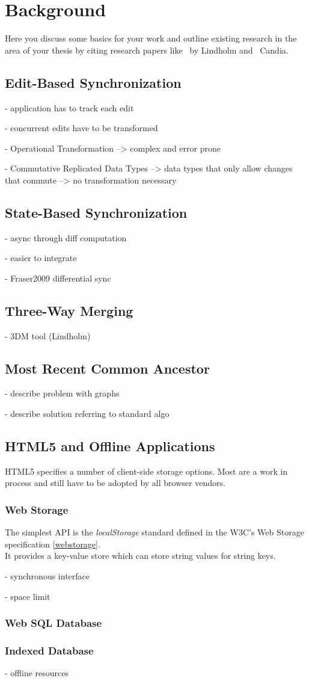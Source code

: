 
\chapter{Background}\label{background}

Here you discuss some basics for your work and outline existing research in the area of your thesis by citing research papers like~\cite{Lindholm:2009wo} by Lindholm and~\cite{DeCandia:2007ui,Ratner:2001wz} Candia.

\section{Edit-Based Synchronization}
- application has to track each edit

- concurrent edits have to be transformed

- Operational Transformation
  --> complex and error prone

- Commutative Replicated Data Types
  --> data types that only allow changes that commute
  --> no transformation necessary

\section{State-Based Synchronization}
- async through diff computation

- easier to integrate

- Fraser2009 differential sync

\section{Three-Way Merging}
- 3DM tool (Lindholm)

\section{Most Recent Common Ancestor}
- describe problem with graphs

- describe solution referring to standard algo

\section{HTML5 and Offline Applications}
HTML5 specifies a number of client-side storage options. Most are a work in process and still have to be adopted by all browser vendors.

\subsection{Web Storage}
The simplest API is the \emph{localStorage} standard defined in the W3C's Web Storage specification \ref{webstorage}.\\
It provides a key-value store which can store string values for string keys.

- synchronous interface

- space limit

\subsection{Web SQL Database}

\subsection{Indexed Database}

- offline resources